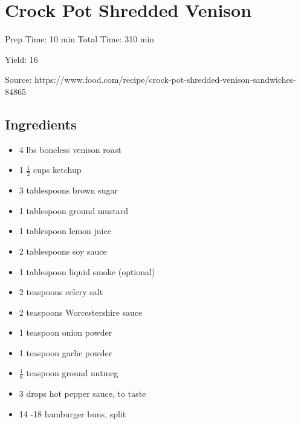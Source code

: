 \section{Crock Pot Shredded Venison}

\begin{center}
Prep Time: 10 min
Total Time: 310 min

\noindent Yield: 16

\vspace{1em}

Source: https://www.food.com/recipe/crock-pot-shredded-venison-sandwiches-84865
\end{center}

\subsection{Ingredients}
\begin{multicols}{2}
\begin{itemize}
    \item 4 lbs boneless venison roast
    \item 1 $\frac{1}{2}$ cups ketchup
    \item 3 tablespoons brown sugar
    \item 1 tablespoon ground mustard
    \item 1 tablespoon lemon juice
    \item 2 tablespoons soy sauce
    \item 1 tablespoon liquid smoke (optional)
    \item 2 teaspoons celery salt
    \item 2 teaspoons Worcestershire sauce
    \item 1 teaspoon onion powder
    \item 1 teaspoon garlic powder
    \item $\frac{1}{8}$ teaspoon ground nutmeg
    \item 3 drops hot pepper sauce, to taste
    \item 14 -18 hamburger buns, split
\end{itemize}
\end{multicols}

